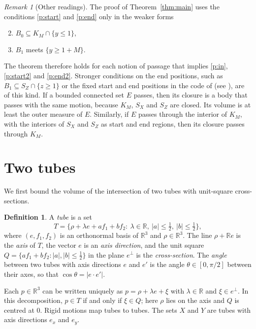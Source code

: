 \documentclass[11pt]{amsart}
\theoremstyle{definition}
\newtheorem{definition}[theorem]{Definition}
\theoremstyle{remark}
\newtheorem{remark}[theorem]{Remark}
\numberwithin{equation}{section}
\newcommand{\R}{\mathbb{R}}
\begin{document}
\begin{remark}[Other readings]\label{rem:readings}
The proof of Theorem~\ref{thm:main} uses the conditions \ref{p:start} and \ref{p:end} only in the weaker forms
\begin{enumerate}[label=(\roman*$'$)]
\setcounter{enumi}{1}
\item\label{p:start2} $B_0\subseteq K_M\cap\{y\le1\}$,
\item\label{p:end2} $B_1$ meets $\{y\ge1+M\}$.
\end{enumerate}
The theorem therefore holds for each notion of passage that implies \ref{p:in}, \ref{p:start2} and \ref{p:end2}. Stronger conditions on the end positions, such as $B_1\subseteq S_Z\cap\{z\ge1\}$ or the fixed start and end positions in the code of \cite{GGTW25} (see \cite[Remark~2.3]{Tan26a}), are of this kind. If a bounded connected set $E$ passes, then its closure is a body that passes with the same motion, because $K_M$, $S_X$ and $S_Z$ are closed. Its volume is at least the outer measure of $E$. Similarly, if $E$ passes through the interior of $K_M$, with the interiors of $S_X$ and $S_Z$ as start and end regions, then its closure passes through $K_M$.
\end{remark}

\section{Two tubes}\label{sec:tubes}

We first bound the volume of the intersection of two tubes with unit-square cross-sections.

\begin{definition}\label{def:tube}
A \emph{tube} is a set
\[
T=\bigl\{\rho+\lambda e+af_1+bf_2:\ \lambda\in\R,\ |a|\le\tfrac12,\ |b|\le\tfrac12\bigr\},
\]
where $(e,f_1,f_2)$ is an orthonormal basis of $\R^3$ and $\rho\in\R^3$. The line $\rho+\R e$ is the \emph{axis} of $T$, the vector $e$ is an \emph{axis direction}, and the unit square $Q=\{af_1+bf_2:|a|,|b|\le\frac12\}$ in the plane $e^\perp$ is the \emph{cross-section}. The \emph{angle} between two tubes with axis directions $e$ and $e'$ is the angle $\theta\in[0,\pi/2]$ between their axes, so that $\cos\theta=|e\cdot e'|$.
\end{definition}

Each $p\in\R^3$ can be written uniquely as $p=\rho+\lambda e+\xi$ with $\lambda\in\R$ and $\xi\in e^\perp$. In this decomposition, $p\in T$ if and only if $\xi\in Q$; here $\rho$ lies on the axis and $Q$ is centred at $0$. Rigid motions map tubes to tubes. The sets $X$ and $Y$ are tubes with axis directions $e_x$ and $e_y$.
\end{document}
